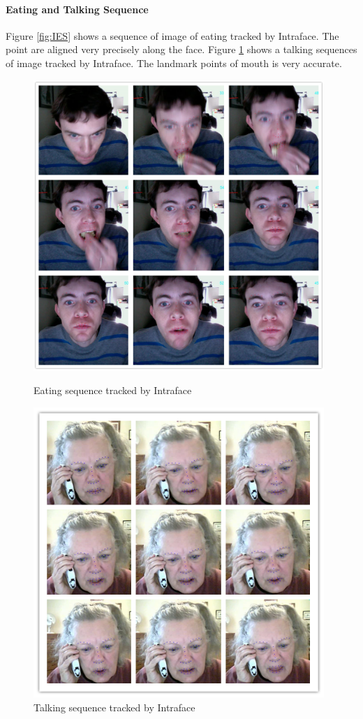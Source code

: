 \paragraph{Eating and Talking Sequence}
Figure \ref{fig:IES} shows a sequence of image of eating tracked by Intraface. The point are aligned very precisely along the face. Figure \ref{fig:ITS} shows a talking sequences of image tracked by Intraface. The landmark points of mouth is very accurate.
\begin{figure}[p]
\centering
\includegraphics[width=110mm]{imgs/Tracking_Intraface_eating_red.png}
\caption{Eating sequence tracked by Intraface}
\label{fig:IES}
\includegraphics[width=110mm]{imgs/Talking_Intraface_140711_176_184.png}
\caption{Talking sequence tracked by Intraface}
\label{fig:ITS}
\end{figure}
\newpage
